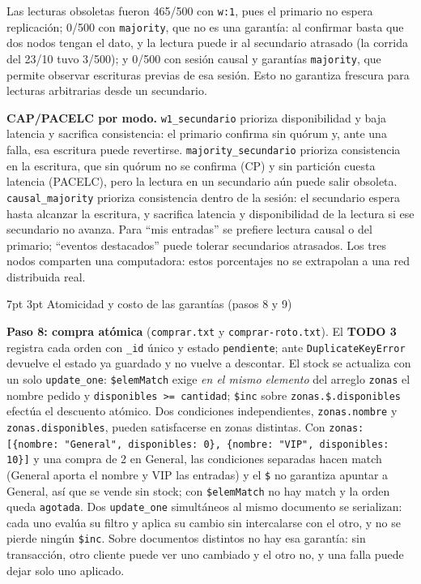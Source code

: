 \documentclass[10pt,letterpaper]{article}
\makeatletter
\renewcommand\section{\@startsection{section}{1}{\z@}%
  {7pt \@plus 2pt \@minus 1pt}{3pt}%
  {\normalfont\normalsize\bfseries\color{acc}}}
\makeatother
\begin{document}
Las lecturas obsoletas fueron 465/500 con \texttt{w:1}, pues el primario no espera
replicación; 0/500 con \texttt{majority}, que no es una garantía: al confirmar basta
que dos nodos tengan el dato, y la lectura puede ir al secundario atrasado (la
corrida del 23/10 tuvo 3/500); y 0/500 con sesión causal y garantías
\texttt{majority}, que permite observar escrituras previas de esa sesión.
Esto no garantiza frescura para lecturas arbitrarias desde un secundario.

\textbf{CAP/PACELC por modo.} \texttt{w1\_secundario} prioriza disponibilidad
y baja latencia y sacrifica consistencia: el primario confirma sin quórum y,
ante una falla, esa escritura puede revertirse. \texttt{majority\_secundario}
prioriza consistencia en la escritura, que sin quórum no se confirma (CP) y
sin partición cuesta latencia (PACELC), pero la lectura en un secundario aún
puede salir obsoleta. \texttt{causal\_majority} prioriza consistencia dentro
de la sesión: el secundario espera hasta alcanzar la escritura, y sacrifica
latencia y disponibilidad de la lectura si ese secundario no avanza. Para ``mis entradas'' se
prefiere lectura causal o del primario; ``eventos destacados'' puede tolerar
secundarios atrasados. Los tres nodos comparten una computadora: estos
porcentajes no se extrapolan a una red distribuida real.


\section{Atomicidad y costo de las garantías (pasos 8 y 9)}

\textbf{Paso 8: compra atómica} (\texttt{comprar.txt} y
\texttt{comprar-roto.txt}). El \textbf{TODO 3} registra cada orden con
\texttt{\_id} único y estado \texttt{pendiente}; ante
\texttt{DuplicateKeyError} devuelve el estado ya guardado y no vuelve a
descontar. El stock se actualiza con un solo \texttt{update\_one}:
\texttt{\$elemMatch} exige \emph{en el mismo elemento} del arreglo
\texttt{zonas} el nombre pedido y \texttt{disponibles >= cantidad};
\texttt{\$inc} sobre \texttt{zonas.\$.disponibles} efectúa el descuento
atómico. Dos condiciones independientes, \texttt{zonas.nombre} y
\texttt{zonas.disponibles}, pueden satisfacerse en zonas distintas. Con
\texttt{zonas: [\{nombre: "General", disponibles: 0\}, \{nombre: "VIP", disponibles: 10\}]}
y una compra de 2 en General, las condiciones separadas hacen match (General
aporta el nombre y VIP las entradas) y el \texttt{\$} no garantiza apuntar a
General, así que se vende sin stock; con \texttt{\$elemMatch} no hay match y
la orden queda \texttt{agotada}. Dos \texttt{update\_one} simultáneos al mismo
documento se serializan: cada uno evalúa su filtro y aplica su cambio sin
intercalarse con el otro, y no se pierde ningún \texttt{\$inc}. Sobre documentos
distintos no hay esa garantía: sin transacción, otro cliente puede ver uno
cambiado y el otro no, y una falla puede dejar solo uno aplicado.
\end{document}
